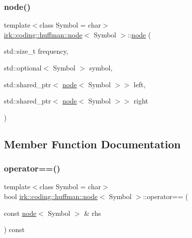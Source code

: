 \subsubsection{\texorpdfstring{node()}{node()}}
{\footnotesize\ttfamily template$<$class Symbol = char$>$ \\
\mbox{\hyperlink{structirk_1_1coding_1_1huffman_1_1node}{irk\+::coding\+::huffman\+::node}}$<$ Symbol $>$\+::\mbox{\hyperlink{structirk_1_1coding_1_1huffman_1_1node}{node}} (\begin{DoxyParamCaption}\item[{std\+::size\+\_\+t}]{frequency,  }\item[{std\+::optional$<$ Symbol $>$}]{symbol,  }\item[{std\+::shared\+\_\+ptr$<$ \mbox{\hyperlink{structirk_1_1coding_1_1huffman_1_1node}{node}}$<$ Symbol $>$$>$}]{left,  }\item[{std\+::shared\+\_\+ptr$<$ \mbox{\hyperlink{structirk_1_1coding_1_1huffman_1_1node}{node}}$<$ Symbol $>$$>$}]{right }\end{DoxyParamCaption})\hspace{0.3cm}{\ttfamily [inline]}}



\subsection{Member Function Documentation}
\mbox{\label{structirk_1_1coding_1_1huffman_1_1node_a4e0666381a95883e54e9a952aefd3a31}} 
\subsubsection{\texorpdfstring{operator==()}{operator==()}}
{\footnotesize\ttfamily template$<$class Symbol = char$>$ \\
bool \mbox{\hyperlink{structirk_1_1coding_1_1huffman_1_1node}{irk\+::coding\+::huffman\+::node}}$<$ Symbol $>$\+::operator== (\begin{DoxyParamCaption}\item[{const \mbox{\hyperlink{structirk_1_1coding_1_1huffman_1_1node}{node}}$<$ Symbol $>$ \&}]{rhs }\end{DoxyParamCaption}) const\hspace{0.3cm}{\ttfamily [inline]}}



